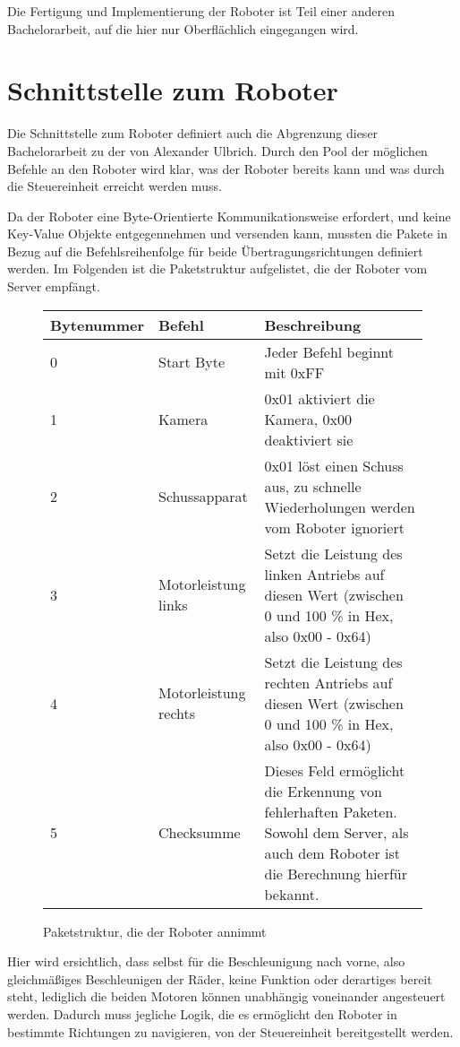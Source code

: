Die Fertigung und Implementierung der Roboter ist Teil einer anderen Bachelorarbeit, auf die hier nur Oberflächlich eingegangen wird.               



\section{Schnittstelle zum Roboter}
\label{sec:schnittstelle}
Die Schnittstelle zum Roboter definiert auch die Abgrenzung dieser Bachelorarbeit zu der von Alexander Ulbrich. Durch den Pool der möglichen Befehle an den Roboter wird klar, was der Roboter bereits kann und was durch die Steuereinheit erreicht werden muss. 

Da der Roboter eine Byte-Orientierte Kommunikationsweise erfordert, und keine Key-Value Objekte entgegennehmen und versenden kann, mussten die Pakete in Bezug auf die Befehlsreihenfolge für beide Übertragungsrichtungen definiert werden.
Im Folgenden ist die Paketstruktur aufgelistet, die der Roboter vom Server empfängt. \\

\begin{figure}[!h]
\begin{tabular}{||p{}||p{}||p{}||}
	\hline Bytenummer & Befehl & Beschreibung \\ 
	\hline 0 & Start Byte &  Jeder Befehl beginnt mit 0xFF\\ 
	\hline 1 & Kamera & 0x01 aktiviert die Kamera, 0x00 deaktiviert sie \\ 
	\hline 2 & Schussapparat & 0x01 löst einen Schuss aus, zu schnelle Wiederholungen werden vom Roboter ignoriert \\ 
	\hline 3 & Motorleistung links & Setzt die Leistung des linken Antriebs auf diesen Wert (zwischen 0 und 100 \% in Hex, also 0x00 - 0x64) \\ 
	\hline 4 & Motorleistung rechts & Setzt die Leistung des rechten Antriebs auf diesen Wert (zwischen 0 und 100 \% in Hex, also 0x00 - 0x64) \\ 
	\hline 5 & Checksumme & Dieses Feld ermöglicht die Erkennung von fehlerhaften Paketen. Sowohl dem Server, als auch dem Roboter ist die Berechnung hierfür bekannt. \\
	\hline
\end{tabular}  
\caption{Paketstruktur, die der Roboter annimmt}
\label{tab:serv_to_robot}
\end{figure}


Hier wird ersichtlich, dass selbst für die Beschleunigung nach vorne, also gleichmäßiges Beschleunigen der Räder, keine Funktion oder derartiges bereit steht, lediglich die beiden Motoren können unabhängig voneinander angesteuert werden. Dadurch muss jegliche Logik, die es ermöglicht den Roboter in bestimmte Richtungen zu navigieren, von der Steuereinheit bereitgestellt werden. \\

